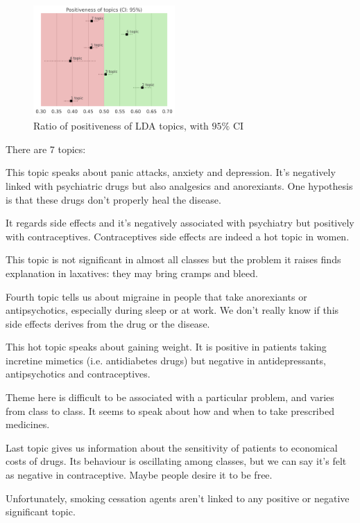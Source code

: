 \documentclass[10pt, a4paper, twocolumn]{article}
\begin{document}
            \begin{figure}[!ht]
                \centering
                \includegraphics[width = 0.48\textwidth]{LDA_positivity_total.png}
                \caption{Ratio of positiveness of LDA topics, with $95\%$ CI}
                \label{fig:lda_total}
            \end{figure}

            There are 7 topics:
            \begin{enumerate}[label=\textbf{[\arabic*]}]
                \item This topic speaks about panic attacks, anxiety and depression. It's negatively linked with psychiatric drugs but also analgesics and anorexiants. One hypothesis is that these drugs don't properly heal the disease.
                \item It regards side effects and it's negatively associated with psychiatry but positively with contraceptives. Contraceptives side effects are indeed a hot topic in women.
                \item This topic is not significant in almost all classes but the problem it raises finds explanation in laxatives: they may bring cramps and bleed.
                \item Fourth topic tells us about migraine in people that take anorexiants or antipsychotics, especially during sleep or at work. We don't really know if this side effects derives from the drug or the disease.
                \item This hot topic speaks about gaining weight. It is positive in patients taking incretine mimetics (i.e. antidiabetes drugs) but negative in antidepressants, antipsychotics and contraceptives.
                \item Theme here is difficult to be associated with a particular problem, and varies from class to class. It seems to speak about how and when to take prescribed medicines.
                \item Last topic gives us information about the sensitivity of patients to economical costs of drugs. Its behaviour is oscillating among classes, but we can say it's felt as negative in contraceptive. Maybe people desire it to be free.
            \end{enumerate}
            Unfortunately, smoking cessation agents aren't linked to any positive or negative significant topic.\\
\end{document}
